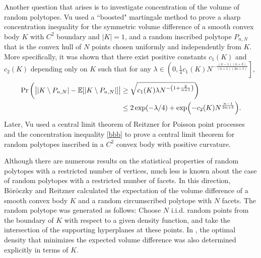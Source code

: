 Another question that arises is to investigate concentration of the volume  of random polytopes. Vu \cite{vu2005sharp} used a ``boosted" martingale method to prove a sharp concentration inequality for the symmetric volume difference of a smooth convex body $K$ with $C^2$ boundary and $|K|=1$, and a random inscribed polytope $P_{n,N}$ that is the convex hull of $N$ points chosen uniformly and independently from $ K.$  %
More specifically, it was shown that there exist positive constants $c_1(K)$ and $c_2(K)$ depending only on $K$ such that for any $\lambda\in\left(0,\frac{1}{4}c_1(K)N^{-\frac{(n-1)(n+3)}{(n+1)(3n+5)}}\right]$,%
\begin{align}
\Pr\bigg(\big||K\setminus P_{n,N}|-\E[|K\setminus P_{n,N}|]\big| &\geq \sqrt{c_1(K)\lambda N^{-\left(1+\frac{2}{n+1}\right)}}\bigg)  \nonumber \\
&\leq 2\exp(-\lambda/4)+\exp\left(-c_2(K) N^{\frac{n-1}{3n+5}}\right).{\label{bbb}}
\end{align}Later, Vu \cite{vu2006central}  used a central limit theorem of Reitzner \cite{reitzner2005central} for Poisson point processes and the concentration inequality \eqref{bbb} to prove a central limit theorem for random polytopes inscribed in a $C^2$ convex body with positive curvature.

Although there are numerous results on the statistical properties of random polytopes with a restricted number of vertices,  much less is known about the case of random polytopes with a restricted number of facets. In this direction, B\"or\"oczky and Reitzner \cite{boroczky2004approximation} calculated the expectation of the volume difference of a smooth convex body $K$ and a random circumscribed polytope with $N$ facets. The random polytope was generated as follows: Choose $ N$ i.i.d. random points from the boundary of $K$  with respect to a given density function, and take the intersection of the supporting hyperplanes at these points. In \cite{boroczky2004approximation}, the optimal density that minimizes the expected volume difference was also determined explicitly in terms of $K$. 


